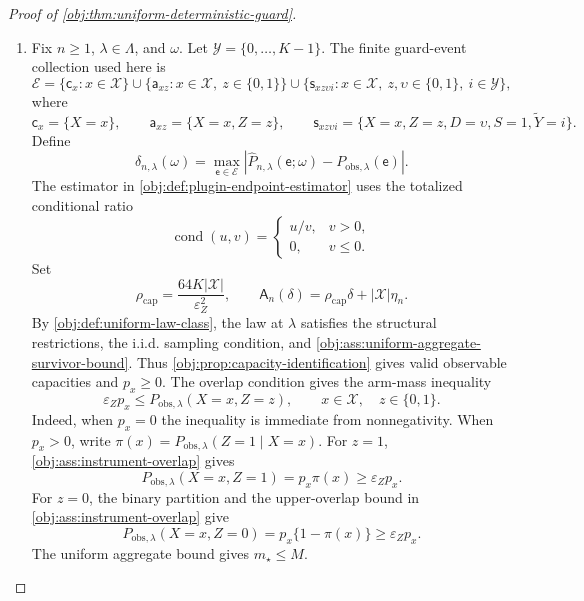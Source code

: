 \documentclass[11pt]{article}
\begin{document}
\begin{proof}[Proof of \cref{obj:thm:uniform-deterministic-guard}]
\begin{enumerate}
\item Fix \(n\ge 1\), \(\lambda\in\Lambda\), and \(\omega\).  Let
\(\mathcal Y=\{0,\ldots,K-1\}\).  The finite guard-event collection used here is
\[
\mathcal E
=
\{\mathsf c_x:x\in\mathcal X\}
\cup
\{\mathsf a_{xz}:x\in\mathcal X,\ z\in\{0,1\}\}
\cup
\{\mathsf s_{xz\upsilon i}:x\in\mathcal X,\ z,\upsilon\in\{0,1\},\ i\in\mathcal Y\},
\]
where
\[
\mathsf c_x=\{X=x\},
\qquad
\mathsf a_{xz}=\{X=x,Z=z\},
\qquad
\mathsf s_{xz\upsilon i}=\{X=x,Z=z,D=\upsilon,S=1,\widetilde Y=i\}.
\]
Define
\[
\delta_{n,\lambda}(\omega)
=
\max_{\mathsf e\in\mathcal E}
\left|
\widehat P_{n,\lambda}(\mathsf e;\omega)
-
P_{\mathrm{obs},\lambda}(\mathsf e)
\right|.
\]
The estimator in \cref{obj:def:plugin-endpoint-estimator} uses the totalized
conditional ratio
\[
\operatorname{cond}(u,v)=
\begin{cases}
u/v, & v>0,\\
0, & v\le 0.
\end{cases}
\]
Set
\[
\rho_{\mathrm{cap}}
=
\frac{64K|\mathcal X|}{\varepsilon_Z^2},
\qquad
\mathsf A_n(\delta)
=
\rho_{\mathrm{cap}}\delta+|\mathcal X|\eta_n .
\]
By \cref{obj:def:uniform-law-class}, the law at \(\lambda\) satisfies the
structural restrictions, the i.i.d. sampling condition, and
\cref{obj:ass:uniform-aggregate-survivor-bound}.  Thus
\cref{obj:prop:capacity-identification} gives valid observable capacities and
\(p_x\ge0\).  The overlap condition gives the arm-mass inequality
\[
\varepsilon_Z p_x
\le
P_{\mathrm{obs},\lambda}(X=x,Z=z),
\qquad x\in\mathcal X,
\quad z\in\{0,1\}.
\]
Indeed, when \(p_x=0\) the inequality is immediate from nonnegativity.  When
\(p_x>0\), write
\(\pi(x)=P_{\mathrm{obs},\lambda}(Z=1\mid X=x)\).  For \(z=1\),
\cref{obj:ass:instrument-overlap} gives
\[
P_{\mathrm{obs},\lambda}(X=x,Z=1)
=
 p_x\pi(x)
\ge
\varepsilon_Zp_x .
\]
For \(z=0\), the binary partition and the upper-overlap bound in
\cref{obj:ass:instrument-overlap} give
\[
P_{\mathrm{obs},\lambda}(X=x,Z=0)
=
 p_x\{1-\pi(x)\}
\ge
\varepsilon_Zp_x .
\]
The uniform aggregate bound gives \(m_\star\le M\).


\end{enumerate}
\end{proof}
\end{document}
